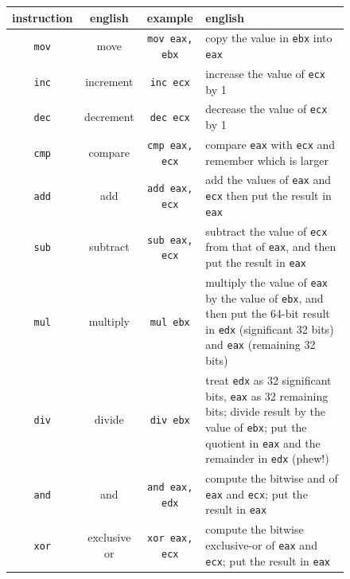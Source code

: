 \documentclass{article}
\newcommand{\xcode}[2]{\colorbox{ubuntuback}{\lstinline[language=#1]|#2|}}
\newcommand{\asm}[1]{\xcode{{[x86masm]assembler}}{#1}}
\begin{document}
\begin{figure}[H]
\centering
    \begin{tabular}{|c|c|c|p{}|}
    \hline
    \textbf{instruction} & \textbf{english} & \textbf{example} & \textbf{english} \\
    \hline 
    
        \asm{mov} & move & \asm{mov eax, ebx} & copy the value in \asm{ebx} into \asm{eax} \\
    \hline 
    
    \asm{inc} & increment & \asm{inc ecx} & increase the value of \asm{ecx} by 1 \\
    \hline 
    
    \asm{dec} & decrement & \asm{dec ecx} & decrease the value of \asm{ecx} by 1 \\
    \hline 

    \asm{cmp} & compare & \asm{cmp eax, ecx} & compare \asm{eax} with \asm{ecx} and remember which is larger \\
    \hline 

    \asm{add} & add & \asm{add eax, ecx} & add the values of \asm{eax} and \asm{ecx} then put the result in \asm{eax} \\
    \hline 

    \asm{sub} & subtract & \asm{sub eax, ecx} & subtract the value of \asm{ecx} from that of \asm{eax}, and then put the result in \asm{eax} \\
    \hline 
    
    \asm{mul} & multiply & \asm{mul ebx} & multiply the value of \asm{eax} by the value of \asm{ebx}, and then put the 64-bit result in \asm{edx} (significant 32 bits) and \asm{eax} (remaining 32 bits)\\
    \hline 

    \asm{div} & divide & \asm{div ebx} & treat \asm{edx} as 32 significant bits, \asm{eax} as 32 remaining bits; divide result by the value of \asm{ebx}; put the quotient in \asm{eax} and the remainder in \asm{edx} (phew!) \\
    \hline 
    
    \asm{and} & and & \asm{and eax, edx} & compute the bitwise and of \asm{eax} and \asm{ecx}; put the result in \asm{eax} \\
    \hline 

    \asm{xor} & exclusive or & \asm{xor eax, ecx} & compute the bitwise exclusive-or of \asm{eax} and \asm{ecx}; put the result in \asm{eax} \\
    \hline 


\end{tabular}
\end{figure}
\end{document}
